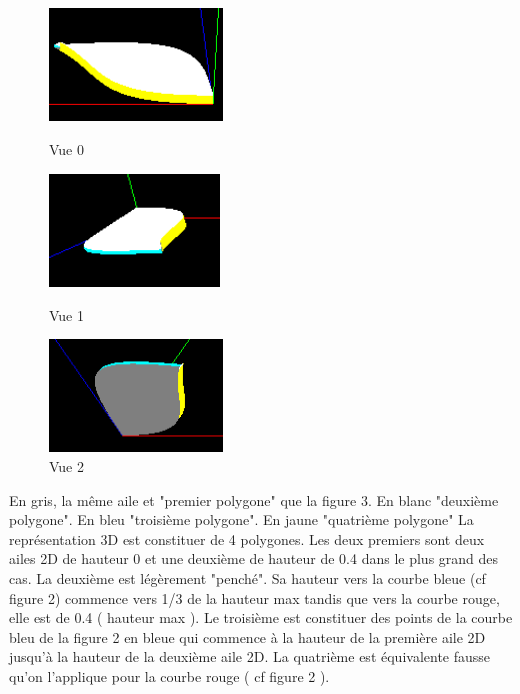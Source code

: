 \documentclass{article}
\begin{document}
\begin{figure}[!htb]
	\centering
	\begin{minipage}{0.3\textwidth}
    	\centering
    	\includegraphics[height=3cm]{./assets/3D_0_bezier.png}
    	\caption{Vue 0}
	\end{minipage}
	\begin{minipage}{0.3\textwidth}
    	\centering
    	\includegraphics[height=3cm]{./assets/3D_1_bezier.png}
    	\caption{Vue 1}
	\end{minipage}
	\begin{minipage}{0.3\textwidth}
    	\centering
    	\includegraphics[height=3cm]{./assets/3D_2_bezier.png}
    	\caption{Vue 2}
	\end{minipage}
\end{figure}
En gris, la même aile et "premier polygone" que la figure 3. En blanc "deuxième polygone". En bleu "troisième polygone". En jaune "quatrième polygone"
\newline
\newline
La représentation 3D est constituer de 4 polygones. Les deux premiers sont deux ailes 2D de hauteur 0 et une deuxième de hauteur de 0.4 dans le plus grand des cas. La deuxième est légèrement "penché". Sa hauteur vers la courbe bleue (cf figure 2) commence vers 1/3 de la hauteur max tandis que vers la courbe rouge, elle est de 0.4 ( hauteur max ). Le troisième est constituer des points de la courbe bleu de la figure 2 en bleue qui commence à la hauteur de la première aile 2D jusqu'à la hauteur de la deuxième aile 2D. La quatrième est équivalente fausse qu'on l'applique pour la courbe rouge ( cf figure 2 ).
\end{document}
